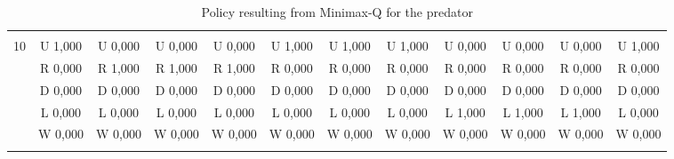 \begin{table}[htbp]
\begin{tiny}
\begin{tabular}{c|c|c|c|c|c|c|c|c|c|c|c|}
\hline \\
10&U 1,000&U 0,000&U 0,000&U 0,000&U 1,000&U 1,000&U 1,000&U 0,000&U 0,000&U 0,000&U 1,000\\
&R 0,000&R 1,000&R 1,000&R 1,000&R 0,000&R 0,000&R 0,000&R 0,000&R 0,000&R 0,000&R 0,000\\
&D 0,000&D 0,000&D 0,000&D 0,000&D 0,000&D 0,000&D 0,000&D 0,000&D 0,000&D 0,000&D 0,000\\
&L 0,000&L 0,000&L 0,000&L 0,000&L 0,000&L 0,000&L 0,000&L 1,000&L 1,000&L 1,000&L 0,000\\
&W 0,000&W 0,000&W 0,000&W 0,000&W 0,000&W 0,000&W 0,000&W 0,000&W 0,000&W 0,000&W 0,000\\
\hline \\
\end{tabular}
\end{tiny}
\caption{Policy resulting from Minimax-Q for the predator}
\end{table}
\clearpage
